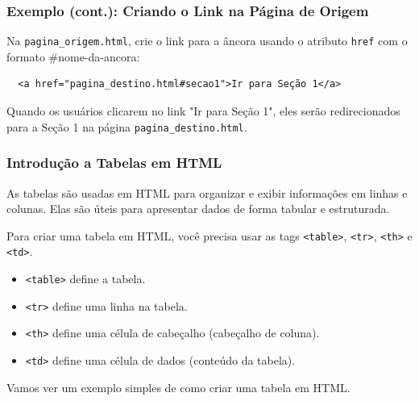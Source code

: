 \documentclass{beamer}
\begin{document}
\begin{frame}[fragile]
  \frametitle{Exemplo (cont.): Criando o Link na Página de Origem}

  Na \texttt{pagina\_origem.html}, crie o link para a âncora usando o atributo \texttt{href} com o formato \#nome-da-ancora:

  \begin{verbatim}
  <a href="pagina_destino.html#secao1">Ir para Seção 1</a>
  \end{verbatim}

  Quando os usuários clicarem no link "Ir para Seção 1", eles serão redirecionados para a Seção 1 na página \texttt{pagina\_destino.html}.
\end{frame}

\begin{frame}
  \frametitle{Introdução a Tabelas em HTML}

  As tabelas são usadas em HTML para organizar e exibir informações em linhas e colunas. Elas são úteis para apresentar dados de forma tabular e estruturada.

  Para criar uma tabela em HTML, você precisa usar as tags \texttt{<table>}, \texttt{<tr>}, \texttt{<th>} e \texttt{<td>}.

  \begin{itemize}
    \item \texttt{<table>} define a tabela.
    \item \texttt{<tr>} define uma linha na tabela.
    \item \texttt{<th>} define uma célula de cabeçalho (cabeçalho de coluna).
    \item \texttt{<td>} define uma célula de dados (conteúdo da tabela).
  \end{itemize}

  Vamos ver um exemplo simples de como criar uma tabela em HTML.
\end{frame}
\end{document}
